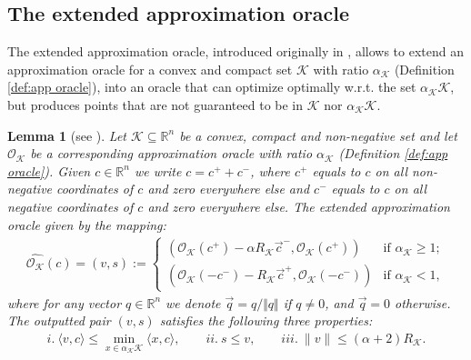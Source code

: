 \documentclass[a4paper,12pt]{article}
\newtheorem{lemma} {Lemma}
\newcommand{\mK}{\mathcal{K}}
\newcommand{\reals}{\mathbb{R}}
\newcommand{\oraclek}{\mathcal{O}_{\mK}}
\begin{document}
\subsection{The extended approximation oracle}
The extended approximation oracle, introduced originally in \cite{kakade2007playing}, allows to extend an approximation oracle  for a convex and compact set $\mK$ with ratio $\alpha_{\mK}$ (Definition \ref{def:app oracle}), into an oracle that can optimize optimally w.r.t. the set $\alpha_{\mK}\mK$, but produces points that are not guaranteed to be in $\mK$ nor $\alpha_{\mK}\mK$. 
\begin{lemma}[see \cite{garber2017efficient}] 
\label{extended oracle}
Let $\mK\subseteq\reals^n$ be a convex, compact and non-negative set and let $\mathcal{O}_{\mK}$ be a corresponding approximation oracle with ratio $\alpha_{\mK}$ (Definition \ref{def:app oracle}). Given $c \in\reals^n$ we write $c=c^+ +c^-$, where $c^+ $ equals to $c$ on all non-negative coordinates of $c$ and zero everywhere else and $c^- $ equals to $c$ on all negative coordinates of $c$ and zero everywhere else. The extended approximation oracle given by the mapping:%
\begin{align}
\widehat{\oraclek}(c)=\left(v ,s \right):= \begin{cases}
    \left({\oraclek(c^+)-\alpha R_\mK \vec{c}^-,\oraclek(c^+)}\right) & \text{if } \alpha_{\mK} \geq 1; \\
   \left({\oraclek(-c^-)-R_\mK \vec{c}^+,\oraclek(-c^-)}\right) & \text{if } \alpha_{\mK} < 1,
\end{cases} 
\end{align}
where for any vector $q\in \mathbb{R}^n$ we denote $\vec{q} = q/\Vert{q}\Vert$ if $q \neq 0$, and $\vec{q} = 0$ otherwise.
The outputted pair $(v,s)$ satisfies the following three properties:
\begin{align*}
i.~\langle{v, c}\rangle \leq \min_{x \in \alpha_{\mK} \mK} \langle{x,c}\rangle, \qquad ii.~ s\leq v, \qquad iii.~\|v\| \leq (\alpha+2)R_\mK.
\end{align*}
\end{lemma}
\end{document}
